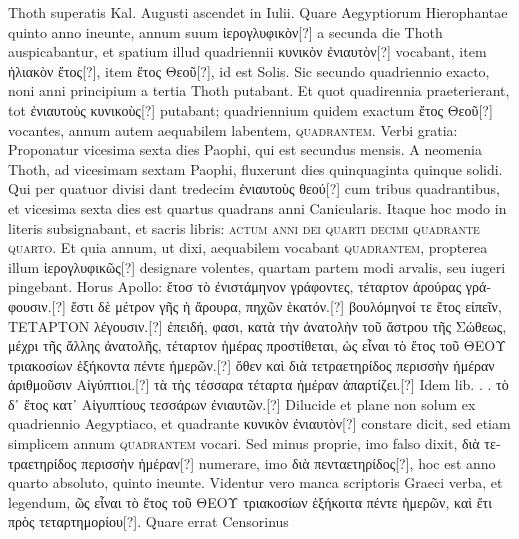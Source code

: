 Thoth superatis Kal. Augusti ascendet in  Iulii.
Quare Aegyptiorum
Hierophantae quinto anno ineunte, annum suum \textgreek{ἱερογλυφικὸν}[?]
a secunda die Thoth auspicabantur, et spatium illud quadriennii
\textgreek{κυνικὸν ἐνιαυτὸν}[?] vocabant, item \textgreek{ἡλιακὸν ἔτος}[?],
 item \textgreek{ἔτος Θεοῦ}[?], id
est Solis.
Sic secundo quadriennio exacto, noni anni principium a
tertia Thoth putabant.
Et quot quadirennia praeterierant, tot \textgreek{ἐνιαυτοὺς
κυνικοὺς}[?] putabant; quadriennium quidem exactum
 \textgreek{ἔτος Θεοῦ}[?] vocantes,
annum autem aequabilem labentem, \textsc{quadrantem}.
Verbi
gratia: Proponatur vicesima sexta dies Paophi, qui est secundus
mensis.
%
A neomenia Thoth, ad vicesimam sextam Paophi, fluxerunt
dies quinquaginta quinque solidi.
Qui per quatuor divisi
dant tredecim \textgreek{ἐνιαυτοὺς θεού}[?] cum tribus quadrantibus, et vicesima
sexta dies est quartus quadrans anni  Canicularis.
Itaque hoc
modo in literis subsignabant, et sacris libris: \textsc{actum anni
dei quarti decimi quadrante quarto}.
Et quia
annum, ut dixi, aequabilem vocabant \textsc{quadrantem}, propterea
illum \textgreek{ἱερογλυφικῶς}[?] designare volentes,
 quartam partem modi arvalis,
seu iugeri pingebant.
Horus Apollo: \textgreek{ἔτοσ τὸ ἐνιστάμηνον γράφοντες,
τέταρτον ἀρούρας γράφουσιν.}[?]
\textgreek{ἔστι δὲ μέτρον γῆς ἡ ἄρουρα, πηχῶν
ἑκατόν.}[?]
\textgreek{βουλόμηνοί τε ἔτος εἰπεῖν, ΤΕΤΑΡΤΟΝ λέγουσιν.}[?]
\textgreek{ἐπειδή,
φασι, κατὰ τὴν ἀνατολὴν τοῦ ἄστρου τῆς Σώθεως, μέχρι τῆς ἄλλης ἀνατολῆς,
τέταρτον ἡμέρας προστίθεται, ὡς εἶναι τὸ ἔτος τοῦ ΘΕΟΥ τριακοσίων
ἑξήκοντα πέντε ἡμερῶν.}[?]
\textgreek{ὅθεν καὶ διὰ τετραετηρίδος περισσὴν ἡμέραν ἀριθμοῦσιν
Αἰγύπτιοι.}[?]
\textgreek{τὰ τὴς τέσσαρα τέταρτα ἡμέραν ἀπαρτίζει.}[?]
Idem lib.
. .
\textgreek{τὸ δ᾽ ἔτος κατ᾽ Αἰγυπτίους τεσσάρων ἐνιαυτῶν.}[?]
Dilucide et
plane non solum ex quadriennio Aegyptiaco, et quadrante \textgreek{κυνικὸν
ἐνιαυτὸν}[?] constare dicit, sed etiam simplicem annum \textsc{quadrantem}
vocari.
Sed minus proprie, imo falso dixit, \textgreek{διὰ
τετραετηρίδος περισσὴν ἡμέραν}[?] numerare, imo \textgreek{διὰ πενταετηρίδος}[?], hoc
est anno quarto absoluto, quinto ineunte.
Videntur vero manca scriptoris
Graeci verba, et legendum, \textgreek{ῶς εἶναι τὸ ἔτος τοῦ ΘΕΟΥ τριακοσίων
ἑξήκοιτα πέντε ἡμερῶν, καὶ ἔτι πρὸς τεταρτημορίου}[?].
Quare errat Censorinus
